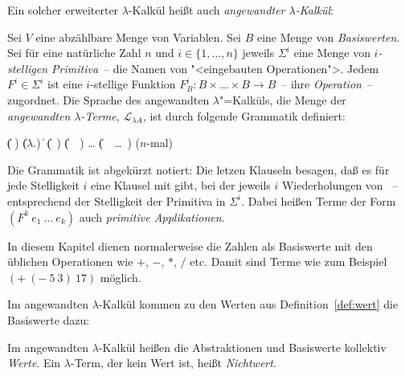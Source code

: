 Ein solcher erweiterter $\lambda$-Kalkül heißt auch
\textit{angewandter $\lambda$-Kalkül}:

\begin{definition}\label{def:lambda-angewandt}
  
  Sei $V$ eine abzählbare Menge von Variablen.  Sei $B$ eine Menge von
  \textit{Basiswerten}.  Sei für eine natürliche
  Zahl $n$ und $i \in \{1, \ldots, n\}$ jeweils $\Sigma^i$ eine Menge
  von \textit{$i$-stelligen Primitiva}~-- die Namen
  von "<eingebauten Operationen">.  Jedem $F^i\in\Sigma^i$ ist eine
  $i$-stellige Funktion $F_B^i: B\times\ldots\times B \rightarrow
  B$~-- ihre \textit{Operation}~--
  zugordnet.  Die Sprache des angewandten $\lambda$"=Kalküls, die
  Menge der \textit{angewandten $\lambda$-Terme},
  $\mathcal{L}_{\lambda{}A}$, ist
  durch folgende Grammatik definiert:
  \begin{grammar}
     \: 
    \> \| ( )
    \> \| ($\lambda$.)
    \> \| 
    \> \| (~)
    \> \| (~~)
    \> \ldots
    \> \| (~~\ldots~) \quad \textrm{($n$-mal)}
  \end{grammar}
  Die Grammatik ist abgekürzt notiert: Die letzen Klauseln besagen,
  daß es für jede Stelligkeit $i$ eine Klausel mit  gibt,
  bei der jeweils $i$ Wiederholungen von
  ~-- entsprechend der Stelligkeit
  der Primitiva in $\Sigma^i$.
Dabei heißen Terme der Form $(F^k~e_1~\ldots~e_k)$ auch
\textit{primitive Applikationen}.
\end{definition}
%
In diesem Kapitel dienen normalerweise die Zahlen als Basiswerte mit
den üblichen Operationen wie $+$, $-$, $\ast$, $/$ etc.  Damit sind
Terme wie zum Beispiel $(+~(-~5~3)~17)$ möglich.

Im angewandten $\lambda$-Kalkül kommen zu den Werten aus
Definition~\ref{def:wert} die Basiswerte dazu:
%
\begin{definition}\label{def:wert-angewandt}
  Im angewandten $\lambda$-Kalkül heißen die Abstraktionen und
  Basiswerte kollektiv \textit{Werte}.  Ein $\lambda$-Term, der kein
  Wert ist, heißt \textit{Nichtwert}.
\end{definition}

